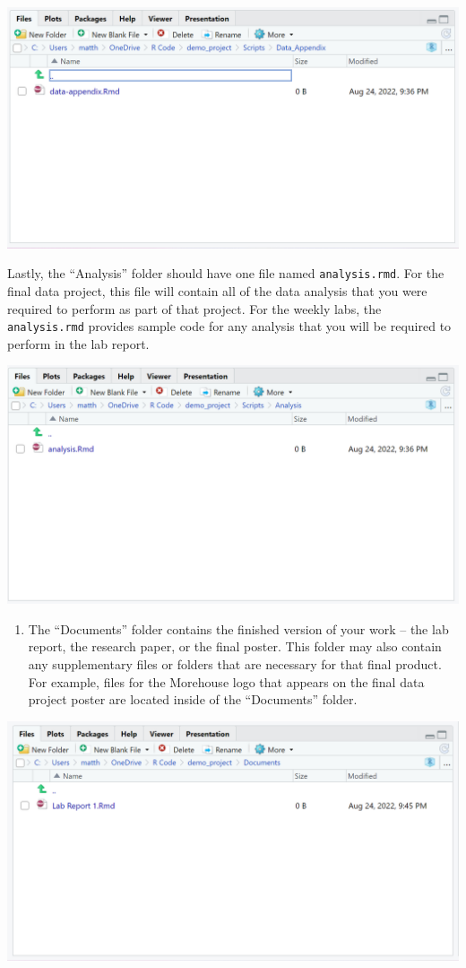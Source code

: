 \documentclass[
]{book}
\providecommand{\tightlist}{%
  \setlength{\itemsep}{0pt}\setlength{\parskip}{0pt}}
\begin{document}
\includegraphics{images/data-appendix.png}

Lastly, the ``Analysis'' folder should have one file named \texttt{analysis.rmd}. For the final data project, this file will contain all of the data analysis that you were required to perform as part of that project. For the weekly labs, the \texttt{analysis.rmd} provides sample code for any analysis that you will be required to perform in the lab report.

\includegraphics{images/tieranalysis.png}

\begin{enumerate}
\def\labelenumi{\arabic{enumi}.}
\setcounter{enumi}{4}
\tightlist
\item
  The ``Documents'' folder contains the finished version of your work -- the lab report, the research paper, or the final poster. This folder may also contain any supplementary files or folders that are necessary for that final product. For example, files for the Morehouse logo that appears on the final data project poster are located inside of the ``Documents'' folder.
\end{enumerate}

\includegraphics{images/labreport.png}
\end{document}
